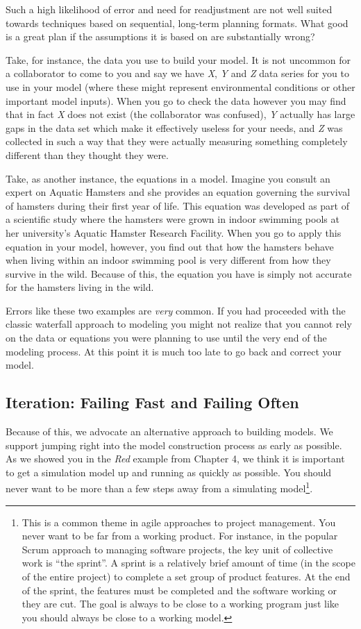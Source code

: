 \documentclass[]{memoir}
\begin{document}
Such a high likelihood of error and need for readjustment are not well
suited towards techniques based on sequential, long-term planning
formats. What good is a great plan if the assumptions it is based on are
substantially wrong?

Take, for instance, the data you use to build your model. It is not
uncommon for a collaborator to come to you and say we have \emph{X},
\emph{Y} and \emph{Z} data series for you to use in your model (where
these might represent environmental conditions or other important model
inputs). When you go to check the data however you may find that in fact
\emph{X} does not exist (the collaborator was confused), \emph{Y}
actually has large gaps in the data set which make it effectively
useless for your needs, and \emph{Z} was collected in such a way that
they were actually measuring something completely different than they
thought they were.

Take, as another instance, the equations in a model. Imagine you consult
an expert on Aquatic Hamsters and she provides an equation governing the
survival of hamsters during their first year of life. This equation was
developed as part of a scientific study where the hamsters were grown in
indoor swimming pools at her university's Aquatic Hamster Research
Facility. When you go to apply this equation in your model, however, you
find out that how the hamsters behave when living within an indoor
swimming pool is very different from how they survive in the wild.
Because of this, the equation you have is simply not accurate for the
hamsters living in the wild.

Errors like these two examples are \emph{very} common. If you had
proceeded with the classic waterfall approach to modeling you might not
realize that you cannot rely on the data or equations you were planning
to use until the very end of the modeling process. At this point it is
much too late to go back and correct your model.

\subsection{Iteration: Failing Fast and Failing Often}

Because of this, we advocate an alternative approach to building models.
We support jumping right into the model construction process as early as
possible. As we showed you in the \emph{Red} example from Chapter 4, we
think it is important to get a simulation model up and running as
quickly as possible. You should never want to be more than a few steps
away from a simulating model\footnote{This is a common theme in agile
  approaches to project management. You never want to be far from a
  working product. For instance, in the popular Scrum approach to
  managing software projects, the key unit of collective work is ``the
  sprint''. A sprint is a relatively brief amount of time (in the scope
  of the entire project) to complete a set group of product features. At
  the end of the sprint, the features must be completed and the software
  working or they are cut. The goal is always to be close to a working
  program just like you should always be close to a working model.}.
\end{document}
